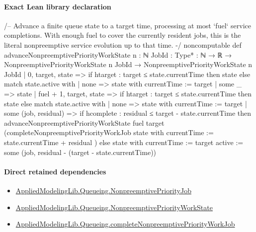 \documentclass[10pt]{article}
\begin{document}
\paragraph{Exact Lean library declaration}
\begin{ReviewVerbatim}
/-- Advance a finite queue state to a target time, processing at most `fuel`
service completions.  With enough fuel to cover the currently resident jobs,
this is the literal nonpreemptive service evolution up to that time. -/
noncomputable def advanceNonpreemptivePriorityWorkState
    {n : ℕ} {JobId : Type*} :
    ℕ → ℝ → NonpreemptivePriorityWorkState n JobId →
      NonpreemptivePriorityWorkState n JobId
  | 0, target, state =>
      if htarget : target ≤ state.currentTime then state
      else match state.active with
      | none => { state with currentTime := target }
      | some _ => state
  | fuel + 1, target, state =>
      if htarget : target ≤ state.currentTime then state
      else match state.active with
      | none => { state with currentTime := target }
      | some (job, residual) =>
          if hcomplete : residual ≤ target - state.currentTime then
            advanceNonpreemptivePriorityWorkState fuel target
              (completeNonpreemptivePriorityWorkJob
                { state with currentTime := state.currentTime + residual })
          else
            { state with
              currentTime := target
              active := some (job, residual - (target - state.currentTime)) }
\end{ReviewVerbatim}

\paragraph{Direct retained dependencies}
\begin{itemize}\raggedright
\item \hyperlink{library-prerequisite-2373fe691c32d999}{Applied\allowbreak{}Modeling\allowbreak{}Lib.\allowbreak{}Queueing.\allowbreak{}Nonpreemptive\allowbreak{}Priority\allowbreak{}Job}
\item \hyperlink{library-prerequisite-e68cb5fce009ec53}{Applied\allowbreak{}Modeling\allowbreak{}Lib.\allowbreak{}Queueing.\allowbreak{}Nonpreemptive\allowbreak{}Priority\allowbreak{}Work\allowbreak{}State}
\item \hyperlink{governing-declaration-e7772cc6b7f51cdf}{Applied\allowbreak{}Modeling\allowbreak{}Lib.\allowbreak{}Queueing.\allowbreak{}complete\allowbreak{}Nonpreemptive\allowbreak{}Priority\allowbreak{}Work\allowbreak{}Job}
\end{itemize}
\end{document}
